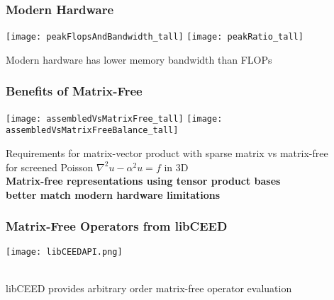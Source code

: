 \documentclass{beamer}
\begin{document}

\begin{frame}
\begin{center}
\frametitle{Modern Hardware}

\texttt{[image: peakFlopsAndBandwidth\_tall]}
\hspace{1cm}
\texttt{[image: peakRatio\_tall]}

Modern hardware has lower memory bandwidth than FLOPs

\end{center}
\end{frame}


\begin{frame}
\begin{center}
\frametitle{Benefits of Matrix-Free}

\texttt{[image: assembledVsMatrixFree\_tall]}
\hspace{1cm}
\texttt{[image: assembledVsMatrixFreeBalance\_tall]}

{\small Requirements for matrix-vector product with sparse matrix vs matrix-free\\ for screened Poisson $\nabla^2 u - \alpha^2 u = f$ in 3D}\\

{\bf Matrix-free representations using tensor product bases\\better match modern hardware limitations}

\end{center}
\end{frame}


\begin{frame}
\begin{center}
\frametitle{Matrix-Free Operators from libCEED}

\texttt{[image: libCEEDAPI.png]}

~\\

libCEED provides arbitrary order matrix-free operator evaluation\\

\end{center}
\end{frame}
\end{document}
